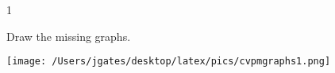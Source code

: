 
\AddToShipoutPicture*{\BackgroundPic}

\addtocounter {ProbNum} {1}

 
{\bf \Large{}} Draw the missing graphs.

\bigskip

\texttt{[image: /Users/jgates/desktop/latex/pics/cvpmgraphs1.png]}

\vfill

\newpage
